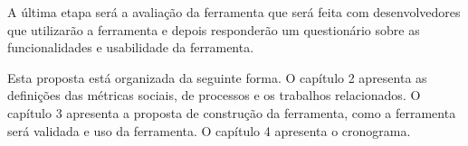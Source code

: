 A última etapa será a avaliação da ferramenta que será feita com desenvolvedores que utilizarão a ferramenta e depois responderão um questionário sobre as funcionalidades e usabilidade da ferramenta.  

Esta proposta está organizada da seguinte forma. O capítulo 2 apresenta as definições das métricas sociais, de processos e os trabalhos relacionados. O capítulo 3 apresenta a proposta de construção da ferramenta, como a ferramenta será validada e uso da ferramenta. O capítulo 4 apresenta o cronograma.
